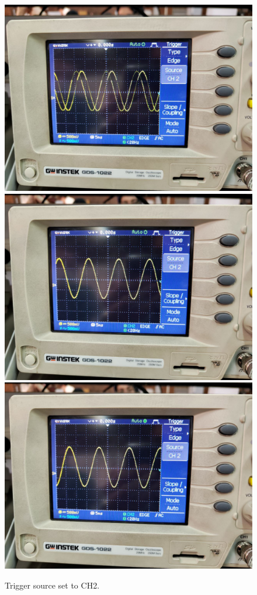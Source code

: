 \documentclass[11pt]{article}
\begin{document}
\begin{question}
{        \begin{figure}[H]
            \begin{center}
                \includegraphics[scale=0.1]{Fig/36.jpeg}
                \includegraphics[scale=0.1]{Fig/37.jpeg}
                \includegraphics[scale=0.1]{Fig/38.jpeg}
                \caption{Trigger source set to CH2.}
            \end{center}
        \end{figure}

}
\end{question}
\end{document}
